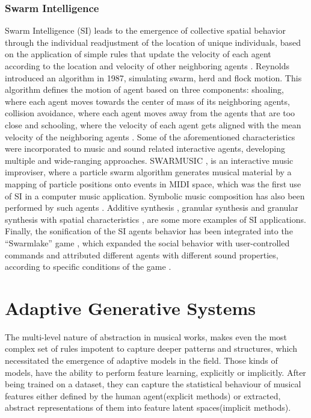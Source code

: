         \subsubsection{Swarm Intelligence}

        Swarm Intelligence (SI) leads to the emergence of collective spatial behavior through the individual readjustment of the location of unique individuals, based on the application of simple rules that update the velocity of each agent according to the location and velocity of other neighboring agents \cite{maxim_kal_pap_book}. Reynolds \cite{reynolds1987flocks} introduced an algorithm in 1987, simulating swarm, herd and flock motion. This algorithm defines the motion of agent based on three components: shoaling, where each agent moves towards the center of mass of its neighboring agents, collision avoidance, where each agent moves away from the agents that are too close and schooling, where the velocity of each agent gets aligned with the mean velocity of the neighboring agents \cite{maxim_kal_pap_book}. Some of the aforementioned characteristics were incorporated to music and sound related interactive agents, developing multiple and wide-ranging approaches. SWARMUSIC \cite{blackwell2002improvised}, is an interactive music improviser, where a particle swarm algorithm generates musical material by a mapping of particle positions onto events in MIDI space, which was the first use of SI in a computer music application. Symbolic music composition has also been performed by such agents \cite{blackwell2003swarm}. Additive synthesis \cite{apergisSonoids2018}, granular synthesis \cite{blackwell2004swarm,blackwell2008swarm}  and granular synthesis with spatial characteristics \cite{wilson2008spatial}, are some more examples of SI applications. Finally, the sonification of the SI agents behavior has been integrated into the “Swarmlake” game \cite{kaliakatsos2014swarm}, which expanded the social behavior with user-controlled commands and attributed different agents with different sound properties, according to specific conditions of the game \cite{maxim_kal_pap_book}.


    \section{Adaptive Generative Systems}
    The multi-level nature of abstraction in musical works, makes even the most complex set of rules impotent to capture deeper patterns and structures, which necessitated the emergence of adaptive models in the field.
    Those kinds of models, have the ability to perform feature learning, explicitly or implicitly. After being trained on a dataset, they can capture the statistical behaviour of musical features either defined by the human agent(explicit methods) or extracted, abstract representations of them into feature latent spaces(implicit methods).


